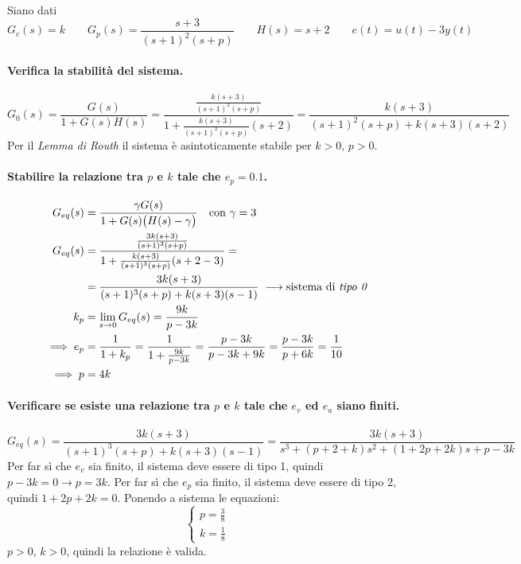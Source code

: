 \begin{esercizio}
Siano dati
\[
	G_c(s) = k \qquad G_p(s) = \frac{s+3}{(s+1)^2(s+p)} \qquad
	H(s) = s+2 \qquad e(t) = u(t) -3y(t)
\]

\paragraph{Verifica la stabilità del sistema.}
\[
	G_0(s) = \frac{G(s)}{1+G(s)H(s)} =
		\frac{\frac{k(s+3)}{(s+1)^2(s+p)}}{1+\frac{k(s+3)}{(s+1)^2(s+p)}(s+2)} =
		\frac{k(s+3)}{(s+1)^2(s+p)+k(s+3)(s+2)}
\]
Per il \emph{Lemma di Routh} il sistema è asintoticamente stabile per \(k>0,\,p>0\).

\paragraph{Stabilire la relazione tra \(p\) e \(k\) tale che \(e_p = 0.1\).}
\begin{align*}
	G_{eq}(s) &= \frac{\gamma G(s)}{1+G(s) \bigl(H(s) - \gamma\bigr)} \quad
			\text{con } \gamma = 3 \\
	G_{eq}(s) &= \frac{\frac{3k(s+3)}{(s+1)^3(s+p)}}{1+\frac{k(s+3)}{(s+1)^3(s+p)}(s+2-3)} = \\
		  &= \frac{3k(s+3)}{(s+1)^3(s+p)+k(s+3)(s-1)} \;
			\longrightarrow \text{sistema di \emph{tipo 0}} \\
	k_p &= \lim_{s\to0} G_{eq}(s) = \frac{9k}{p-3k} \\
	\implies e_p &= \frac{1}{1+k_p} = \frac{1}{1+\frac{9k}{p-3k}} = \frac{p-3k}{p-3k+9k} = \frac{p-3k}{p+6k} = \frac{1}{10} \\
	\implies p &= 4k
\end{align*}

\paragraph{Verificare se esiste una relazione tra \(p\) e \(k\) tale che \(e_v\) ed \(e_a\) siano finiti.}
\[
	G_{eq}(s) = \frac{3k(s+3)}{(s+1)^3(s+p)+k(s+3)(s-1)} = \frac{3k(s+3)}{s^3 +(p+2+k)s^2 +(1+2p+2k)s +p-3k}
\]
Per far sì che \(e_v\) sia finito, il sistema deve essere di tipo 1, quindi \(p-3k=0 \rightarrow p = 3k\). Per far sì che \(e_p\) sia finito, il sistema deve essere di tipo 2, quindi \(1+2p+2k=0\). Ponendo a sistema le equazioni:
\[\begin{cases}
	p = \frac{3}{8} \\
	k = \frac{1}{8}
\end{cases}\]
\(p>0\), \(k>0\), quindi la relazione è valida.
\end{esercizio}

